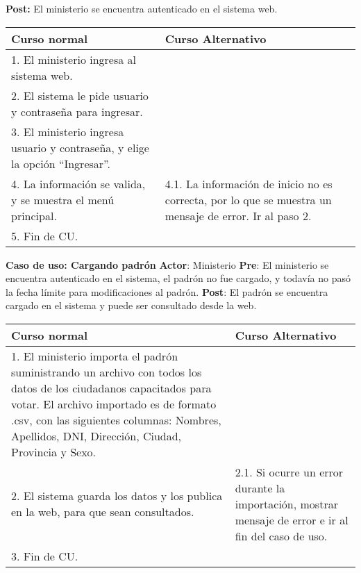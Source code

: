 \textbf{Post:} El ministerio se encuentra autenticado en el sistema web.
\begin{table}[h!]
	
 \begin{tabular}{|p{7.5cm} | p{7.5cm}|} 
 \hline
 \textbf{Curso normal} & \textbf{Curso Alternativo} \\
 \hline
 1. El ministerio ingresa al sistema web. & \\
 \hline
 
 2. El sistema le pide usuario y contraseña para ingresar. & \\
 \hline 
 3. El ministerio ingresa usuario y contraseña, y elige la opción “Ingresar”. & \\
 \hline 
 4. La información se valida, y se muestra el menú principal. & 
4.1. La información de inicio no es correcta, por lo que se muestra un mensaje de error. Ir al paso 2.
\\
 \hline 
 5. Fin de CU. & \\

 \hline
 \end{tabular}

\end{table}


\textbf{Caso de uso: Cargando padrón}
\textbf{Actor}: Ministerio
\textbf{Pre}: El ministerio se encuentra autenticado en el sistema, el padrón no fue cargado, y todavía no pasó la fecha límite para modificaciones al padrón.
\textbf{Post}: El padrón se encuentra cargado en el sistema y puede ser consultado desde la web.
\begin{table}[h!]
	
 \begin{tabular}{|p{7.5cm} | p{7.5cm}|} 
 \hline
 \textbf{Curso normal} & \textbf{Curso Alternativo} \\
 \hline
1. El ministerio importa el padrón suministrando un archivo con todos los datos de los ciudadanos capacitados para votar.
El archivo importado es de formato .csv, con las siguientes columnas: Nombres, Apellidos, DNI, Dirección, Ciudad, Provincia y Sexo. & \\
\hline

2. El sistema guarda los datos y los publica en la web, para que sean consultados. &
2.1. Si ocurre un error durante la importación, mostrar mensaje de error e ir al fin del caso de uso. \\
\hline
3. Fin de CU. & \\

 \end{tabular}

\end{table}





